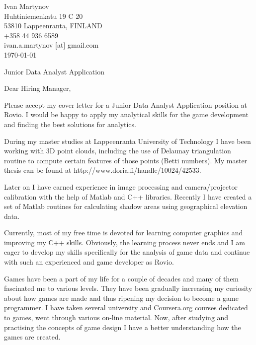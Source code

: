\documentclass[]{article}
\begin{document}
\begin{flushright}
	Ivan Martynov\\
  Huhtiniemenkatu 19 C 20\\
	53810 Lappeenranta, FINLAND\\
	+358 44 936 6589\\
	ivan.a.martynov [at] gmail.com\\
	\today
\end{flushright}


\begin{center}
  Junior Data Analyst Application
\end{center}

\noindent
Dear Hiring Manager,
\bigskip

\noindent
Please accept my cover letter for a Junior Data Analyst Application position at
Rovio. I would be happy to apply my analytical skills for the game development
and finding the best solutions for analytics.
\medskip

\noindent
During my master studies at Lappeenranta University of Technology I have been
working with 3D point clouds, including the use of Delaunay triangulation
routine to compute certain features of those points (Betti numbers). My master
thesis can be found at http://www.doria.fi/handle/10024/42533.
\medskip

\noindent
Later on I have earned experience in image processing and camera/projector
calibration with the help of Matlab and C++ libraries. Recently I have created
a set of Matlab routines for calculating shadow areas using
geographical elevation data.
\medskip

\noindent
Currently, most of my free time is devoted for learning computer graphics and
improving my C++ skills. Obviously, the learning process never ends and I am
eager to develop my skills specifically for the analysis of game data and
continue with such an experienced and game developer as Rovio.
\medskip

\noindent
Games have been a part of my life for a couple of decades and many of them
fascinated me to various levels. They have been gradually increasing my
curiosity about how games are made and thus ripening my decision to become a
game programmer. I have taken several university and Coursera.org courses
dedicated to games, went through various on-line material. Now, after studying
and practising the concepts of game design I have a better understanding how
the games are created.
\medskip
\end{document}
